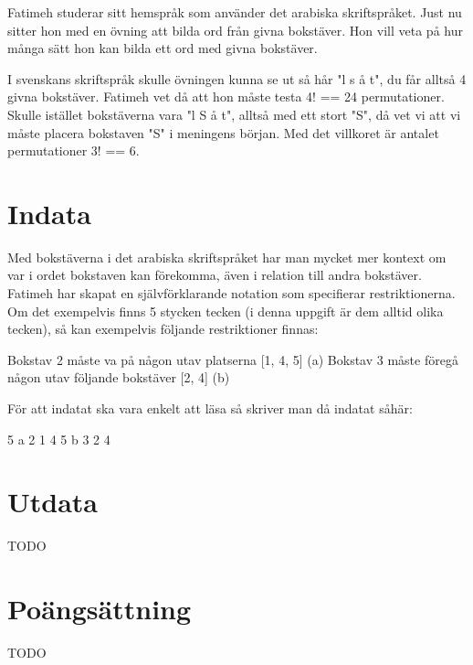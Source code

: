 
Fatimeh studerar sitt hemspråk som använder det arabiska skriftspråket. Just nu
sitter hon med en övning att bilda ord från givna bokstäver. Hon vill veta på
hur många sätt hon kan bilda ett ord med givna bokstäver.

I svenskans skriftspråk skulle övningen kunna se ut så hår "l s å t", du får
alltså 4 givna bokstäver. Fatimeh vet då att hon måste testa 4! == 24
permutationer. Skulle istället bokstäverna vara "l S å t", alltså med ett stort
"S", då vet vi att vi måste placera bokstaven "S" i meningens början. Med det
villkoret är antalet permutationer 3! == 6.

\section*{Indata}

Med bokstäverna i det arabiska skriftspråket har man mycket mer kontext om var i ordet bokstaven kan förekomma, även i relation till andra bokstäver. Fatimeh har skapat en självförklarande notation som specifierar restriktionerna. Om det exempelvis finns 5 stycken tecken (i denna uppgift är dem alltid olika tecken), så kan exempelvis följande restriktioner finnas:

    Bokstav 2 måste va på någon utav platserna [1, 4, 5] (a)
    Bokstav 3 måste föregå någon utav följande bokstäver [2, 4] (b)

För att indatat ska vara enkelt att läsa så skriver man då indatat såhär:

5
a 2 1 4 5
b 3 2 4


\section*{Utdata}

TODO

\section*{Poängsättning}

TODO
